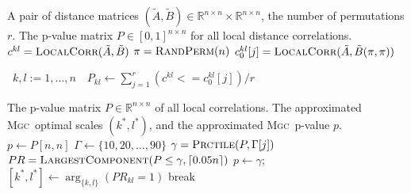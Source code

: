 \documentclass[11pt]{article}
\providecommand{\sct}[1]{{\normalfont\textsc{#1}}}
\newcommand{\Real}{\mathbb{R}}
\newcommand{\G}{c}
\newcommand{\Linefor}[2]{%
    \State \algorithmicfor\ {#1}\ \algorithmicdo\ {#2} \algorithmicend\ \algorithmicfor%
}
\newcommand{\Mgc}{\sct{Mgc}}
\newcommand{\rto}{\leftarrow}
\begin{document}
\begin{algorithm}
\caption{P-value Computation for All Local Correlations. This algorithm computes the p-values of all local correlation by the permutation test with $r$ random permutations, which takes $O(rn^2 \log n)$. $\pi$ denotes a random permutation, and $\tilde{B}(\pi,\pi)$ denotes the distance matrix with the observation label permuted. In the real data experiment we always set $r=10$,$000$.}
\label{alg:pval}
\begin{algorithmic}[1]
\Require A pair of distance matrices $(\tilde{A},\tilde{B}) \in \Real^{n \times n} \times \Real^{n \times n}$, the number of permutations $r$.
\Ensure The p-value matrix $P \in [0,1]^{n \times n}$ for all local distance correlations.
\State $\G^{kl}=\textsc{LocalCorr}(\tilde{A},\tilde{B})$ 
\State $\pi=\textsc{RandPerm}(n)$  
\State $\G^{kl}_{0}[j]=\textsc{LocalCorr}(\tilde{A},\tilde{B}(\pi,\pi))$ 
\EndFor

\Linefor{$k,l:=1,\ldots,n$}{$P_{kl} \rto \sum_{j=1}^{r}(\G^{kl}<=\G^{kl}_{0}[j])/r$}
\EndFunction
\end{algorithmic}
\end{algorithm}

\begin{algorithm}
\caption{Optimal Local Scales Approximation by P-values. This algorithm approximates the optimal scales $(k^{*},l^{*})$ from the p-values of consecutive local correlations, and outputs both the optimal scales and their corresponding \Mgc~p-value. If the global p-value is among the top $10\%$ of all p-values, we take the global correlation directly. Otherwise we check a list of possible p-values from $10\%$ onwards, find the largest connected component in the p-value map that are smaller than each candidate p-value by requiring connection through a square of size at least $0.05n$, and take the candidate p-value as the approximated \Mgc~p-value only when there exists a large area of connected component. The running time is $O(n^2)$; see Appendix~\ref{appen:diss} for more discussion. }
\label{alg:best_scale}
\begin{algorithmic}[1]
\Require The p-value matrix $P \in \Real^{n \times n}$ of all local correlations.
\Ensure The approximated \Mgc~optimal scales $(k^{*},l^{*})$, and the approximated \Mgc~p-value $p$.
\State $p \rto P[n,n]$ 
\State $\Gamma \rto \{10,20,\ldots,90\}$ 
\State $\gamma=\textsc{Prctile}(P,\Gamma[j])$ 
\State $PR = \textsc{LargestComponent}(P \leq \gamma,\left\lceil 0.05n \right\rceil)$ 
\State $p \rto \gamma$;
\State $[k^{*},l^{*}] \rto \arg_{\{k,l\}} (PR_{kl}=1)$
\State break
\EndIf
\EndFor
\EndIf
\EndFunction
\end{algorithmic}
\end{algorithm}
\end{document}
